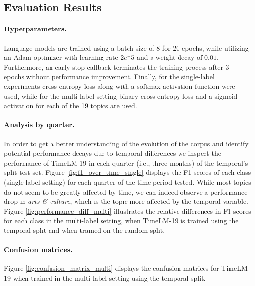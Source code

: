 \subsection{Evaluation Results}\label{appendix:TweetTopic-evaluation}

\paragraph{Hyperparameters.} Language models are trained using a batch size of 8 for 20 epochs, while utilizing an Adam optimizer \cite{loshchilov2017decoupled} with learning rate $2e^-5$ and a weight decay of $0.01$. Furthermore, an early stop callback  terminates the training process after 3 epochs without performance improvement. Finally, for the single-label experiments cross entropy loss along with a softmax activation function were used, while for the multi-label setting binary cross entropy loss and a sigmoid activation for each of the 19 topics are used.


\paragraph{Analysis by quarter.} In order to get a better understanding of the evolution of the corpus and identify potential performance decays due to temporal differences we inspect the performance of TimeLM-19 in each quarter (i.e., three months) of the temporal's split test-set. Figure \ref{fig:f1_over_time_single} displays the F1 scores of each class (single-label setting) for each quarter of the time period tested. While most topics do not seem to be greatly affected by time, we can indeed observe a performance drop in \textit{arts \& culture}, which is the topic more affected by the temporal variable. Figure \ref{fig:performance_diff_multi} illustrates the relative differences in F1 scores for each class in the multi-label setting, when TimeLM-19 is trained using the temporal split and when trained on the random split.

\paragraph{Confusion matrices.} Figure \ref{fig:confusion_matrix_multi} displays the confusion matrices for TimeLM-19 when trained in the multi-label setting using the temporal split.



